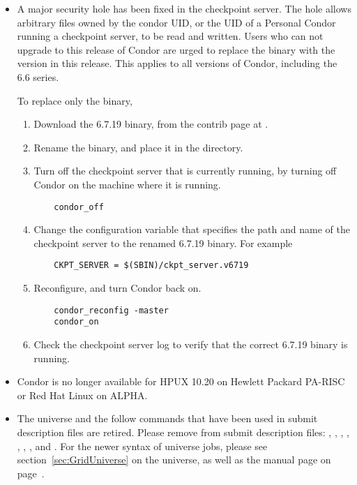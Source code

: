 \begin{itemize}

\item A major security hole has been fixed in the checkpoint server.
The hole allows arbitrary
files owned by the condor UID, or the UID of a Personal Condor running a
checkpoint server, to be read and written. Users who can not upgrade
to this release of Condor are urged to replace the 
binary
with the version in this release. This applies to all versions of Condor,
including the 6.6 series.

To replace only the  binary,
  \begin{enumerate}
  \item Download the 6.7.19  binary,
  from the contrib page at
  .
  \item Rename the binary, and place it in the
   directory.
  \item Turn off the checkpoint server that is currently running,
  by turning off Condor on the machine where it is running.
  \begin{verbatim}
    condor_off 
  \end{verbatim}
  \item Change the configuration variable that specifies the
  path and name of the checkpoint server to the renamed 
  6.7.19  binary.
  For example
  \begin{verbatim}
    CKPT_SERVER = $(SBIN)/ckpt_server.v6719
  \end{verbatim}
  \item Reconfigure, and turn Condor back on.
  \begin{verbatim}
    condor_reconfig -master 
    condor_on
  \end{verbatim}
  \item Check the checkpoint server log to verify that the
  correct 6.7.19  binary is running.
  \end{enumerate}

\item Condor is no longer available for HPUX 10.20 on Hewlett
Packard PA-RISC or Red Hat Linux on ALPHA.

\item The  universe and the follow commands
that have been used in submit description files are retired.
Please remove from submit description files:
, ,
, ,
, ,
, and .
For the newer syntax of  universe jobs,
please see
section~\ref{sec:GridUniverse} on the  universe,
as well as the  manual page
on page~\pageref{man-condor-submit}.


\end{itemize}
